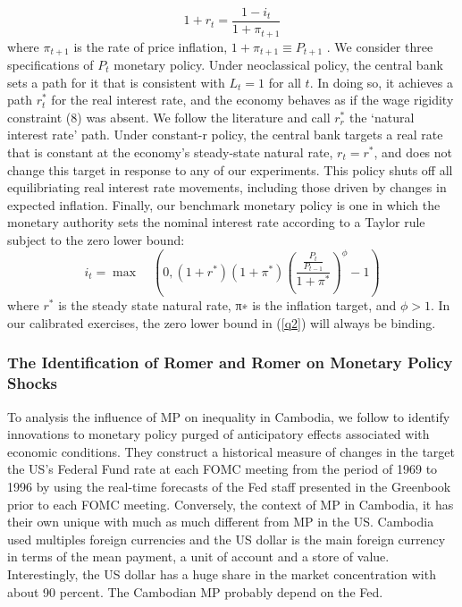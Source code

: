 \documentclass[11pt,letterpaper]{article}
\begin{document}
\begin{equation}
	1 + r_{t} = \frac{1 - i_{t}}{1+ \pi_{t+1}}
\end{equation}
where $\pi_{t+1}$ is the rate of price inflation, $1 + \pi_{t+1} \equiv P_{t +1}$ . We consider three specifications of $P_{t}$ monetary policy. Under neoclassical policy, the central bank sets a path for it that is consistent with $L_{t} = 1$ for all $t$. In doing so, it achieves a path $r_{t}^{\ast}$ for the real interest rate, and the economy behaves as if the wage rigidity constraint (8) was absent. We follow the literature and call $r_{r}^{\ast}$ the ‘natural interest rate’ path. Under constant-r policy, the central bank targets a real rate that is constant at the economy’s steady-state natural rate, $r_{t} = r^{\ast}$, and does not change this target in response to any of our experiments. This policy shuts off all equilibriating real interest rate movements, including those driven by changes in expected inflation. Finally, our benchmark monetary policy is one in which the monetary authority sets the nominal interest rate according to a Taylor rule subject to the zero lower bound:
\begin{equation}\label{q2}
	i_{t} = \max \quad \left(0, (1 + r^{\ast})(1 + \pi^{\ast}) \left( \frac{\frac{P_{t}}{P_{t -1}}}{1 + \pi^{\ast}}\right)^{\phi} -1 \right)
\end{equation}
where $r^{\ast}$ is the steady state natural rate, π∗ is the inflation target, and $\phi > 1$. In our calibrated exercises, the zero lower bound in (\ref{q2}) will always be binding.

\subsubsection{The Identification of Romer and Romer on Monetary Policy Shocks}
To analysis the influence  of MP on inequality in Cambodia, we follow \citet{Romer2004} to identify innovations to monetary policy purged of anticipatory effects associated with economic conditions. They construct a historical measure of changes in the target the US's Federal Fund rate at each FOMC meeting from the period of 1969 to 1996 by using the real-time forecasts of the Fed staff presented in the Greenbook prior to each FOMC meeting. Conversely, the context of MP in Cambodia, it has their own unique with much as much different from MP in the US. Cambodia used multiples foreign currencies and the US dollar is the main foreign currency in terms of the mean payment, a unit of account and a store of value. Interestingly, the US dollar has a huge share in the market concentration with about 90 percent. The Cambodian MP probably depend on the Fed.
\end{document}
